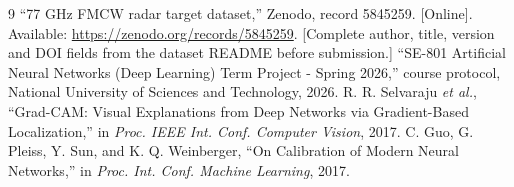 \IfFileExists{IEEEtran.cls}{\ieeetrue\documentclass[conference]{IEEEtran}}{\ieeefalse\documentclass[10pt,twocolumn,letterpaper]{article}}
\begin{document}
\begin{thebibliography}{9}
 ``77 GHz FMCW radar target dataset,'' Zenodo, record 5845259. [Online]. Available: \url{https://zenodo.org/records/5845259}. [Complete author, title, version and DOI fields from the dataset README before submission.]
 ``SE-801 Artificial Neural Networks (Deep Learning) Term Project - Spring 2026,'' course protocol, National University of Sciences and Technology, 2026.
 R. R. Selvaraju \emph{et al.}, ``Grad-CAM: Visual Explanations from Deep Networks via Gradient-Based Localization,'' in \emph{Proc. IEEE Int. Conf. Computer Vision}, 2017.
 C. Guo, G. Pleiss, Y. Sun, and K. Q. Weinberger, ``On Calibration of Modern Neural Networks,'' in \emph{Proc. Int. Conf. Machine Learning}, 2017.
\end{thebibliography}
\end{document}

